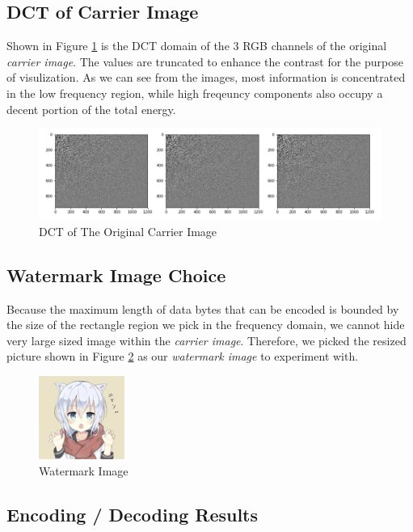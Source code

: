 \documentclass{article}
\begin{document}
\subsection{DCT of Carrier Image}

Shown in Figure \ref{fig:dct_original} is the DCT domain of the 3 RGB channels of
the original \textit{carrier image}. The values are truncated to enhance the contrast
for the purpose of visulization. As we can see from the images, most information
is concentrated in the low frequency region, while high freqeuncy components also
occupy a decent portion of the total energy.

\begin{figure}[h]
    \centering
    \includegraphics[width=\textwidth]{dct_original}
    \caption{DCT of The Original Carrier Image}
    \label{fig:dct_original}
\end{figure}

\subsection{Watermark Image Choice}

Because the maximum length of data bytes that can be encoded is bounded by
the size of the rectangle region we pick in the frequency domain, we cannot
hide very large sized image within the \textit{carrier image}. Therefore, we
picked the resized picture shown in Figure \ref{fig:small} as our \textit{watermark
image} to experiment with.

\begin{figure}[h]
    \centering
    \includegraphics[width=0.25\textwidth]{small}
    \caption{Watermark Image}
    \label{fig:small}
\end{figure}

\subsection{Encoding / Decoding Results}
\end{document}
